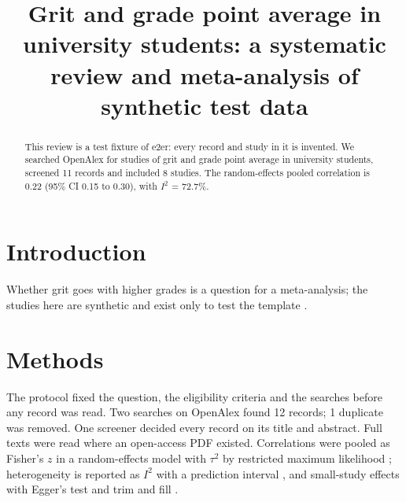 \title{Grit and grade point average in university students: a systematic review and meta-analysis of synthetic test data}
\begin{abstract}
This review is a test fixture of e2er: every record and study in it is invented. We searched OpenAlex for studies of
grit and grade point average in university students, screened 11 records and included
8 studies. The random-effects pooled correlation is 0.22
(95\% CI 0.15 to 0.30), with
$I^2$ = 72.7\%.
\end{abstract}

\section{Introduction}
Whether grit goes with higher grades is a question for a meta-analysis; the studies here are synthetic and exist only to
test the template \citep{page2021prisma}.

\section{Methods}
The protocol fixed the question, the eligibility criteria and the searches before any record was read. Two searches
on OpenAlex found 12 records; 1 duplicate was removed. One screener
decided every record on its title and abstract. Full texts were read where an open-access PDF existed. Correlations were
pooled as Fisher's $z$ in a random-effects model with $\tau^2$ by restricted maximum likelihood
\citep{viechtbauer2005bias,viechtbauer2010conducting}; heterogeneity is reported as $I^2$ \citep{higgins2002quantifying}
with a prediction interval \citep{riley2011interpretation}, and small-study effects with Egger's test
\citep{egger1997bias} and trim and fill \citep{duval2000trim}.

